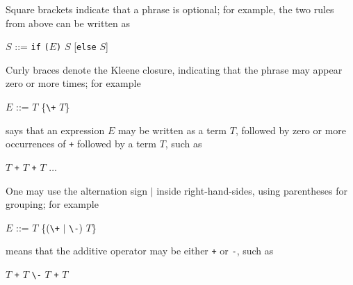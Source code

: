 \documentclass[8pt,a4paper,compress]{beamer}
\newcommand{\mm}[1]{$#1$}
\newenvironment{spaced}
{
\smallskip
\hspace{.5cm}
\begin{minipage}[c]{\textwidth}
}
{
\end{minipage}
\smallskip
}
\begin{document}
\begin{frame}[fragile]
\pause

Square brackets indicate that a phrase is optional; for example, the two rules from above can be written as

\text{ }
\begin{spaced}
\begin{production}
\mm{S} ::=  \lstinline{if} \lstinline{(}\mm{E}\lstinline{)} \mm{S} [\lstinline{else} \mm{S}]
\end{production}
\end{spaced}

\pause
\bigskip

Curly braces denote the Kleene closure, indicating that the phrase may appear zero or more times; for example

\text{ }
\begin{spaced}
\begin{production}
\mm{E} ::= \mm{T} \{\lstinline{\+} \mm{T}\}
\end{production}
\end{spaced}

\noindent says that an expression $E$ may be written as a term $T$, followed by zero or more  occurrences of \lstinline{+} followed by a term $T$, such as

\text{ }
\begin{spaced}
\begin{production}
\mm{T} \lstinline{+} \mm{T} \lstinline{+} \mm{T} \mm{\dots}
\end{production}
\end{spaced}

\pause

One may use the alternation sign $|$ inside right-hand-sides, using parentheses for grouping; for example

\text{ }
\begin{spaced}
\begin{production}
\mm{E} ::= \mm{T} \{(\lstinline{\+} \mm{|} \lstinline{\-}) \mm{T}\}
\end{production}
\end{spaced}

\noindent means that the additive operator may be either \lstinline{+} or \lstinline{-}, such as

\text{ }
\begin{spaced}
\begin{production}
\mm{T} \lstinline{+} \mm{T} \lstinline{\-} \mm{T} \lstinline{+} \mm{T}
\end{production}
\end{spaced}
\end{frame}
\end{document}
